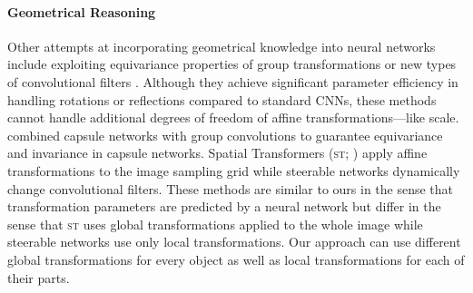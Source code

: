 \paragraph{Geometrical Reasoning}
Other attempts at incorporating geometrical knowledge into neural networks include exploiting equivariance properties of group transformations \citep{Cohen2016group} or new types of convolutional filters \citep{Mallat,Kocvok2016cyclic}.
Although they achieve significant parameter efficiency in handling rotations or reflections compared to standard \glspl{CNN}, these methods cannot handle additional degrees of freedom of affine transformations---like scale. \cite{Lenssen2018group} combined capsule networks with group convolutions to guarantee equivariance and invariance in capsule networks.
Spatial Transformers (\textsc{st}; \cite{Jaderberg2015}) apply affine transformations to the image sampling grid while steerable networks \citep{Cohen2016steerable,Jacobsen2017dynamic} dynamically change convolutional filters.
These methods are similar to ours in the sense that transformation parameters are predicted by a neural network but differ in the sense that \textsc{st} uses global transformations applied to the whole image while steerable networks use only local transformations.
Our approach can use different global transformations for every object as well as local transformations for each of their parts.


